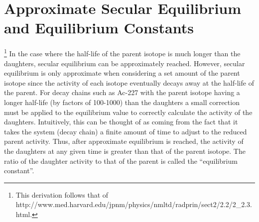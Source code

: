 \documentclass[11pt]{article}
\begin{document}
\section{Approximate Secular Equilibrium and Equilibrium Constants}
\label{S:3}
\footnote{This derivation follows that of http://www.med.harvard.edu/jpnm/physics/nmltd/radprin/sect2/2.2/2\_2.3.html.}
In the case where the half-life of the parent isotope is much longer than the daughters, secular equilibrium can be approximately reached. However, secular equilibrium is only approximate when considering a set amount of the parent isotope since the activity of each isotope eventually decays away at the half-life of the parent. For decay chains such as Ac-227 with the parent isotope having a longer half-life (by factors of 100-1000) than the daughters a small correction must be applied to the equilibrium value to correctly calculate the activity of the daughters. Intuitively, this can be thought of as coming from the fact that it takes the system (decay chain) a finite amount of time to adjust to the reduced parent activity. Thus, after approximate equilibrium is reached, the activity of the daughters at any given time is greater than that of the parent isotope. The ratio of the daughter activity to that of the parent is called the ``equilibrium constant''. 
\end{document}
